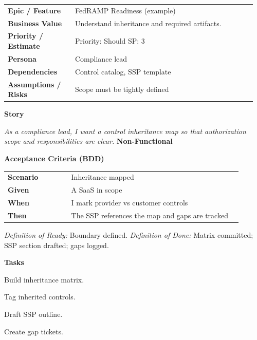 \documentclass[11pt,letterpaper]{article}
\makeatletter
\newenvironment{kvtable}{%
  \begin{tabular}{@{}>{\bfseries\arraybackslash}p{0.26\linewidth} p{0.70\linewidth}@{}}
}{\end{tabular}}
\newenvironment{bdd}{%
  \begin{tabular}{@{}>{\bfseries\arraybackslash}p{0.26\linewidth} p{0.70\linewidth}@{}}
}{\end{tabular}}
\newcommand{\DoRDoD}[2]{%
  \vspace{0.35em}
  {\footnotesize\color{Muted}%
    \textit{Definition of Ready:} #1 \; \textbullet\;
    \textit{Definition of Done:} #2%
  }%
}
\newenvironment{storycard}[2]{%
  \begin{tcolorbox}[cloudcard, title={#1 --- #2}]%
}{\end{tcolorbox}}
\newcommand{\sectionlabel}[1]{\vspace{0.35em}\textbf{#1}\par}
\makeatother
\begin{document}
\begin{storycard}{CCS-27}{Ch. 27 — Government Certification \& Accreditation}
\begin{kvtable}
Epic / Feature & FedRAMP Readiness (example)\\
Business Value & Understand inheritance and required artifacts.\\
Priority / Estimate & Priority: Should \quad SP: 3\\
Persona & Compliance lead\\
Dependencies & Control catalog, SSP template\\
Assumptions / Risks & Scope must be tightly defined\\
\end{kvtable}
\sectionlabel{Story}
\textit{As a compliance lead, I want a control inheritance map so that authorization scope and responsibilities are clear.}
\sectionlabel{Non-Functional}\;
\sectionlabel{Acceptance Criteria (BDD)}
\begin{bdd}
Scenario & Inheritance mapped\\
Given & A SaaS in scope\\
When & I mark provider vs customer controls\\
Then & The SSP references the map and gaps are tracked\\
\end{bdd}
\DoRDoD{Boundary defined.}{Matrix committed; SSP section drafted; gaps logged.}
\sectionlabel{Tasks}
\begin{checklist}
\item Build inheritance matrix.
\item Tag inherited controls.
\item Draft SSP outline.
\item Create gap tickets.
\end{checklist}
\end{storycard}
\end{document}
